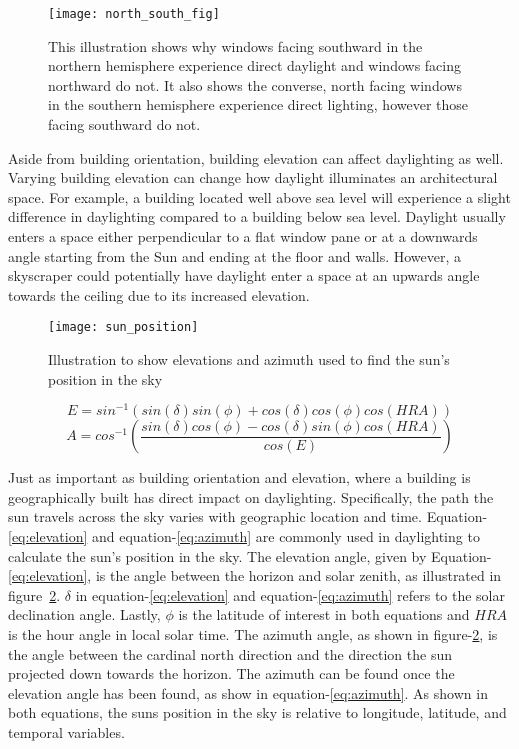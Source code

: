     \begin{figure}[h]
      \centering
      \texttt{[image: north\_south\_fig]}
      \caption{This illustration shows why windows facing southward in the northern hemisphere experience direct daylight and windows facing northward do not. It also shows the converse, north facing windows in the southern hemisphere experience direct lighting, however those facing southward do not.} 
      \label{fig:north_south}
    \end{figure}

    Aside from building orientation, building elevation can affect daylighting as well. Varying building elevation can change how daylight illuminates an architectural space. For example, a building located well above sea level will experience a slight difference in daylighting compared to a building below sea level. Daylight usually enters a space either perpendicular to a flat window pane or at a downwards angle starting from the Sun and ending at the floor and walls. However, a skyscraper could potentially have daylight enter a space at an upwards angle towards the ceiling due to its increased elevation.\\


    \begin{figure}[h]
      \centering
      \texttt{[image: sun\_position]}
      \caption{Illustration to show elevations and azimuth used to find the sun's position in the sky} 
      \label{fig:sun_position}
    \end{figure}

    \begin{equation} \label{eq:elevation}
    E = sin^{-1}(sin(\delta) sin(\phi) + cos(\delta) cos(\phi) cos(HRA))
    \end{equation}
    \begin{equation} \label{eq:azimuth}
    A = cos^{-1}( \frac{sin(\delta) cos(\phi) - cos(\delta) sin(\phi) cos(HRA)}{cos(E)})
    \end{equation}

    Just as important as building orientation and elevation, where a building is geographically built has direct impact on daylighting.
    Specifically, the path the sun travels across the sky varies with geographic location and time. 
    Equation-\ref{eq:elevation} and equation-\ref{eq:azimuth} are commonly used in daylighting to calculate the sun's position in the sky. 
    The elevation angle, given by Equation-\ref{eq:elevation}, is the angle between the horizon and solar zenith, as illustrated in figure~\ref{fig:sun_position}. 
    $\delta$ in  equation-\ref{eq:elevation} and equation-\ref{eq:azimuth} refers to the solar declination angle. 
    Lastly, $\phi$ is the latitude of interest in both equations and $HRA$ is the hour angle in local solar time.
    The azimuth angle, as shown in figure-\ref{fig:sun_position}, is the angle between the cardinal north direction and the direction the sun projected down towards the horizon. The azimuth can be found once the elevation angle has been found, as show in equation-\ref{eq:azimuth}.
    As shown in both equations, the suns position in the sky is relative to longitude, latitude, and temporal variables.\\

